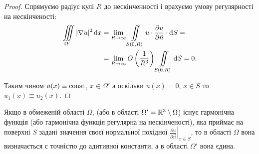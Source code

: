 \begin{proof}
	Спрямуємо радіус кулі $R$ до нескінченності і врахуємо умову регулярності на нескінченості:
	\begin{equation}
		\begin{aligned}
			\displaystyle\iiint\limits_{\Omega'} |\nabla u|^2 \mathop{}\!\mathrm{d} x &= \displaystyle\lim\limits_{R \to \infty} \displaystyle\iint\limits_{S(0, R)} u \cdot \frac{\partial u}{\partial \vec n} \cdot \mathop{}\!\mathrm{d} S = \\
			&= \displaystyle\lim\limits_{R \to \infty} O \left( \frac{1}{R^3} \right) \displaystyle\iint\limits_{S(0, R)} \mathop{}\!\mathrm{d} S = 0.
		\end{aligned}
	\end{equation}

	Таким чином $u(x) \equiv \operatorname{const}$, $x \in \Omega'$ а оскільки $u(x) = 0$, $x \in S$ то $u_1(x) \equiv u_2(x)$.
\end{proof}

\begin{theorem}
	Якщо в обмеженій області $\Omega$, (або в області $\Omega' = \mathbb{R}^3 \setminus \Omega$) існує гармонічна функція (або гармонічна функція регулярна на нескінченості), яка приймає на поверхні $S$ задані значення своєї нормальної похідної $\left. \frac{\partial u}{\partial \vec n} \right|_{x \in S}$, то в області $\Omega$ вона визначається с точністю до адитивної константи, а в області $\Omega'$ вона єдина.
\end{theorem}

